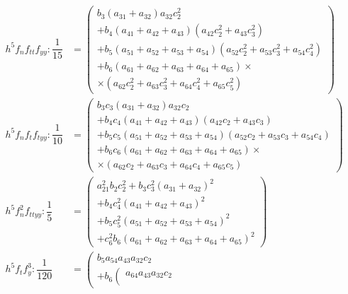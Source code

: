\documentclass[a4paper,oneside]{book}
\numberwithin{equation}{chapter}
\begin{document}
\begin{align}
{h^5}{f_n}{f_{tt}}{f_{yy}}:\dfrac{1}{{15}} &= \left( \begin{array}{l}
{b_3}\left( {{a_{31}} + {a_{32}}} \right){a_{32}}c_2^2\\
 + {b_4}\left( {{a_{41}} + {a_{42}} + {a_{43}}} \right)\left( {{a_{42}}c_2^2 + {a_{43}}c_3^2} \right)\\
 + {b_5}\left( {{a_{51}} + {a_{52}} + {a_{53}} + {a_{54}}} \right)\left( {{a_{52}}c_2^2 + {a_{53}}c_3^2 + {a_{54}}c_4^2} \right)\\
 + {b_6}\left( {{a_{61}} + {a_{62}} + {a_{63}} + {a_{64}} + {a_{65}}} \right) \times \\
 \times \left( {{a_{62}}c_2^2 + {a_{63}}c_3^2 + {a_{64}}c_4^2 + {a_{65}}c_5^2} \right)
\end{array} \right)\\
{h^5}{f_n}{f_t}{f_{tyy}}:\dfrac{1}{{10}} &= \left( \begin{array}{l}
{b_3}{c_3}\left( {{a_{31}} + {a_{32}}} \right){a_{32}}{c_2}\\
 + {b_4}{c_4}\left( {{a_{41}} + {a_{42}} + {a_{43}}} \right)\left( {{a_{42}}{c_2} + {a_{43}}{c_3}} \right)\\
 + {b_5}{c_5}\left( {{a_{51}} + {a_{52}} + {a_{53}} + {a_{54}}} \right)\left( {{a_{52}}{c_2} + {a_{53}}{c_3} + {a_{54}}{c_4}} \right)\\
 + {b_6}{c_6}\left( {{a_{61}} + {a_{62}} + {a_{63}} + {a_{64}} + {a_{65}}} \right) \times \\
 \times \left( {{a_{62}}{c_2} + {a_{63}}{c_3} + {a_{64}}{c_4} + {a_{65}}{c_5}} \right)
\end{array} \right)\\
{h^5}f_n^2{f_{ttyy}}:\dfrac{1}{5} &= \left( \begin{array}{l}
a_{21}^2{b_2}c_2^2 + {b_3}c_3^2{\left( {{a_{31}} + {a_{32}}} \right)^2}\\
 + {b_4}c_4^2{\left( {{a_{41}} + {a_{42}} + {a_{43}}} \right)^2}\\
 + {b_5}c_5^2{\left( {{a_{51}} + {a_{52}} + {a_{53}} + {a_{54}}} \right)^2}\\
 + c_6^2{b_6}{\left( {{a_{61}} + {a_{62}} + {a_{63}} + {a_{64}} + {a_{65}}} \right)^2}
\end{array} \right)\\
{h^5}{f_t}f_y^3:\dfrac{1}{{120}} &= \left( \begin{array}{l}
{b_5}{a_{54}}{a_{43}}{a_{32}}{c_2}\\
 + {b_6}\left( \begin{array}{l}
{a_{64}}{a_{43}}{a_{32}}{c_2}\\

\end{array}
\end{array}
\end{align}
\end{document}
